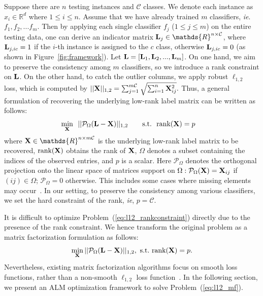 \documentclass[10pt,twocolumn,letterpaper]{article}
\def\calP{\mathcal{P}}
\def\calC{{\mathcal{C}}}
\def\bL{{\bf L}}
\def\dsR{\mathds{R}}
\def\bX{{\bf X}}
\def\bX{{\bf X}}
\def\st{{\text{s.t.}}}
\def\ie{\emph{ie}}
\def\rank{{\text{rank}}}
\begin{document}
Suppose there are $n$ testing instances and $\calC$ classes.
We denote each instance as $x_i \in \dsR^{d}$ where $1 \leq i \leq n$.
Assume that we have already trained $m$ classifiers, \ie. $f_1, f_2, ... f_m$.
Then by applying each single classifier $f_j$ ($1 \leq j \leq m$) on the entire testing data, one can derive an indicator matrix $\bL_j \in \dsR^{n \times \calC}$, where $\bL_{j, ic} = 1$ if the $i$-th instance is assigned to the $c$ class, otherwise $\bL_{j, ic} = 0$ (as shown in Figure~\ref{fig:framework}).
Let $\bL = [ \bL_1, \bL_2, ..., \bL_m ]$.
On one hand, we aim to preserve the consistency among $m$ classifiers, so we introduce a rank constraint on $\bL$.
On the other hand, to catch the outlier columns, we apply robust $\ell_{1, 2}$ loss, which is computed by
$
|| \bX ||_{1,2} = \sum_{j = 1}^{m\calC} \sqrt{ \sum_{i = 1}^{n} \bX_{ij}^2 }  .
$
Thus, a general formulation of recovering the underlying low-rank label matrix can be written as follows:
{
\begin{align}\label{eq:l12_rankconstraint}
  \min_{\bX} ~&~ || \calP_{\Omega} (\bL - \bX) ||_{1,2}~~~~~~\st~~\rank(\bX) = p
\end{align}
}
\noindent
where $\bX \in \dsR^{n \times m\calC}$ is the underlying low-rank label matrix to be recovered, $\rank(\bX)$ obtains the rank of $\bX$,
$\Omega$ denotes a subset containing the indices of the observed entries,
and $p$ is a scalar.
Here $\calP_{\Omega}$ denotes the orthogonal projection onto the linear space of matrices support on $\Omega: \calP_{\Omega}(\bX) = \bX_{ij}$ if $(ij) \in \Omega$; $\calP_{\Omega} = 0$ otherwise.
This includes some cases where missing elements may occur~\cite{vanicassp2014late}.
In our setting, to preserve the consistency among various classifiers, we set the hard constraint of the rank, \ie, $p = \calC$.



It is difficult to optimize Problem~(\ref{eq:l12_rankconstraint}) directly due to the presence of the rank constraint.
We hence transform the original problem as a matrix factorization formulation as follows:
{
\begin{align}\label{eq:l12_mf}
  \min_{\bX} || \calP_{\Omega}(\bL - \bX) ||_{1,2} ,~  \st~ \rank(\bX) = p  .
\end{align}
}
\noindent
Nevertheless, existing matrix factorization algorithms focus on smooth loss functions, rather than a non-smooth $\ell_{1,2}$ loss function~\cite{tanicml2014riemannian,vandereycken2013lowrank,Wen2012,ngonips2012scaled,rtrmc2011boumal}.
In the following section, we present an ALM optimization framework to solve Problem~(\ref{eq:l12_mf}).
\end{document}
